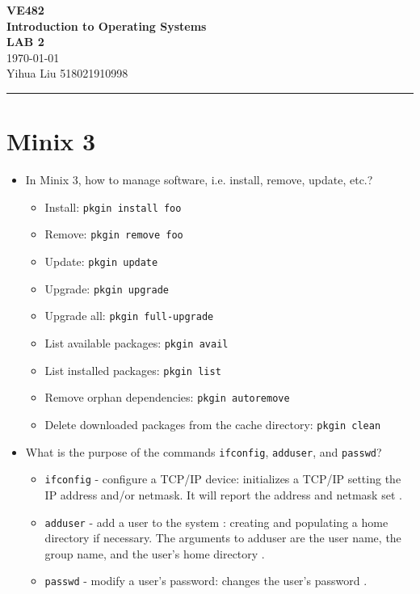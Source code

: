 \documentclass[a4paper]{article}
\begin{document}
\begin{center}
    \huge
    \textbf{VE482\\Introduction to Operating Systems\\}
    \Large
    \vspace{15pt}
    \uppercase{\textbf{Lab 2}}\\
    \large
    \vspace{5pt}\today\\
    \vspace{5pt}
    Yihua Liu 518021910998
    \vspace{5pt}
    \rule[-5pt]{.97\linewidth}{0.05em}
\end{center}
\section{Minix 3}
\begin{itemize}
    \item In Minix 3, how to manage software, i.e. install, remove, update, etc.? \cite{pkgin}
    \begin{itemize}
        \item Install: \texttt{pkgin install foo}
        \item Remove: \texttt{pkgin remove foo}
        \item Update: \texttt{pkgin update}
        \item Upgrade: \texttt{pkgin upgrade}
        \item Upgrade all: \texttt{pkgin full-upgrade}
        \item List available packages: \texttt{pkgin avail}
        \item List installed packages: \texttt{pkgin list}
        \item Remove orphan dependencies: \texttt{pkgin autoremove}
        \item Delete downloaded packages from the cache directory: \texttt{pkgin clean}
    \end{itemize}
    \item What is the purpose of the commands \texttt{ifconfig}, \texttt{adduser}, and \texttt{passwd}?
    \begin{itemize}
        \item \texttt{ifconfig} - configure a TCP/IP device: initializes a TCP/IP setting the IP address and/or netmask. It will report the address and netmask set \cite{ifconfig}.
        \item \texttt{adduser} - add a user to the system \cite{useradd}: creating and populating a home directory if necessary. The arguments to adduser are the user name, the group name, and the user's home directory \cite{adduser}.
        \item \texttt{passwd} - modify a user's password: changes the user's password \cite{passwd}.
    \end{itemize}
\end{itemize}
\end{document}
